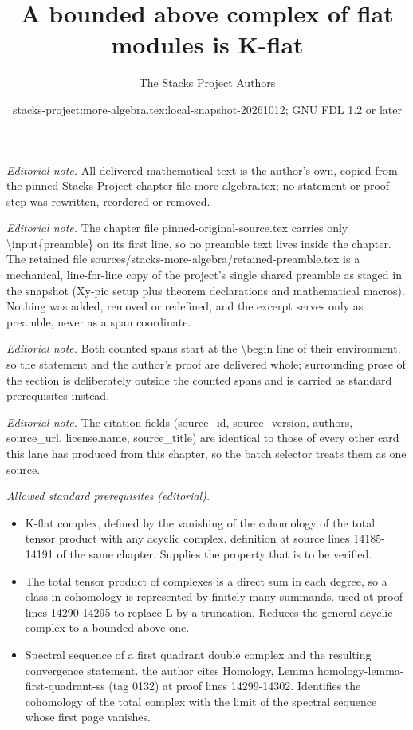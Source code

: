 \documentclass[10pt,a4paper]{amsart}
\title{A bounded above complex of flat modules is K-flat}
\author{The Stacks Project Authors}
\date{stacks-project:more-algebra.tex:local-snapshot-20261012; GNU FDL 1.2 or later}
\theoremstyle{plain}
\theoremstyle{definition}
\theoremstyle{remark}
\numberwithin{equation}{subsection}
\begin{document}
\maketitle
\setcounter{subsection}{1}
\noindent\textit{Editorial note.} All delivered mathematical text is the author's own, copied from the pinned Stacks Project chapter file more-algebra.tex; no statement or proof step was rewritten, reordered or removed.\par\medskip
\noindent\textit{Editorial note.} The chapter file pinned-original-source.tex carries only \textbackslash{}input\{preamble\} on its first line, so no preamble text lives inside the chapter. The retained file sources/stacks-more-algebra/retained-preamble.tex is a mechanical, line-for-line copy of the project's single shared preamble as staged in the snapshot (Xy-pic setup plus theorem declarations and mathematical macros). Nothing was added, removed or redefined, and the excerpt serves only as preamble, never as a span coordinate.\par\medskip
\noindent\textit{Editorial note.} Both counted spans start at the \textbackslash{}begin line of their environment, so the statement and the author's proof are delivered whole; surrounding prose of the section is deliberately outside the counted spans and is carried as standard prerequisites instead.\par\medskip
\noindent\textit{Editorial note.} The citation fields (source\_id, source\_version, authors, source\_url, license.name, source\_title) are identical to those of every other card this lane has produced from this chapter, so the batch selector treats them as one source.\par\medskip
\noindent\textit{Allowed standard prerequisites (editorial).}\begin{itemize}
\item K-flat complex, defined by the vanishing of the cohomology of the total tensor product with any acyclic complex. definition at source lines 14185-14191 of the same chapter. Supplies the property that is to be verified.
\item The total tensor product of complexes is a direct sum in each degree, so a class in cohomology is represented by finitely many summands. used at proof lines 14290-14295 to replace L by a truncation. Reduces the general acyclic complex to a bounded above one.
\item Spectral sequence of a first quadrant double complex and the resulting convergence statement. the author cites Homology, Lemma homology-lemma-first-quadrant-ss (tag 0132) at proof lines 14299-14302. Identifies the cohomology of the total complex with the limit of the spectral sequence whose first page vanishes.
\end{itemize}\medskip
\end{document}

